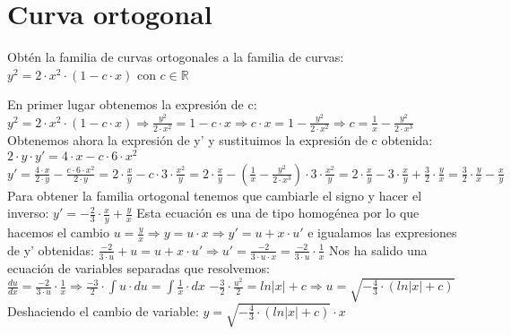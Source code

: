 
\section{Curva ortogonal}
\begin{ejer}
	Obtén la familia de curvas ortogonales a la familia de curvas:  
	$y^2 = 2\cdot x^2\cdot (1-c\cdot x)$ con $c\in \mathbb{R}$
\end{ejer}
\begin{sol}
	En primer lugar obtenemos la expresión de c:  
	$y^2 = 2\cdot x^2 \cdot (1-c\cdot x)\Rightarrow \frac{y^2}{2\cdot x^2} = 1-c\cdot x \Rightarrow c\cdot x = 1-\frac{y^2}{2\cdot x^2} \Rightarrow c = \frac{1}{x} - \frac{y^2}{2\cdot x^3}$  
	Obtenemos ahora la expresión de y' y sustituimos la expresión de c obtenida:  
	$2\cdot y\cdot y' = 4\cdot x - c\cdot 6\cdot x^2$  
	$y' = \frac{4\cdot x}{2\cdot y}-\frac{c\cdot 6\cdot x^2}{2\cdot y} = 2\cdot \frac{x}{y}-c\cdot 3\cdot \frac{x^2}{y} = 2\cdot \frac{x}{y}-(\frac{1}{x}-\frac{y^2}{2\cdot x^3})\cdot 3\cdot \frac{x^2}{y} = 2\cdot \frac{x}{y}-3\cdot \frac{x}{y} + \frac{3}{2}\cdot \frac{y}{x} = \frac{3}{2}\cdot \frac{y}{x} - \frac{x}{y}$  
	Para obtener la familia ortogonal tenemos que cambiarle el signo y hacer el inverso:  
	$y' = -\frac{2}{3}\cdot \frac{x}{y} + \frac{y}{x}$  
	Esta ecuación es una de tipo homogénea por lo que hacemos el cambio $u = \frac{y}{x} \Rightarrow y = u\cdot x\Rightarrow y' = u+x\cdot u'$  e igualamos las expresiones de y' obtenidas:  
	$\frac{-2}{3\cdot u} + u = u + x\cdot u'\Rightarrow u' = \frac{-2}{3\cdot u\cdot x} = \frac{-2}{3\cdot u}\cdot \frac{1}{x}$  
	Nos ha salido una ecuación de variables separadas que resolvemos:  
	$\frac{du}{dx} = \frac{-2}{3\cdot u}\cdot \frac{1}{x}\Rightarrow \frac{-3}{2}\cdot \int u\cdot du = \int \frac{1}{x}\cdot dx$  
	$-\frac{3}{2}\cdot \frac{u^2}{2} = ln|x| + c \Rightarrow u = \sqrt{-\frac{4}{3}\cdot(ln|x| + c)}$  
	Deshaciendo el cambio de variable:  
	$y = \sqrt{-\frac{4}{3}\cdot (ln|x| + c)}\cdot x$
\end{sol}